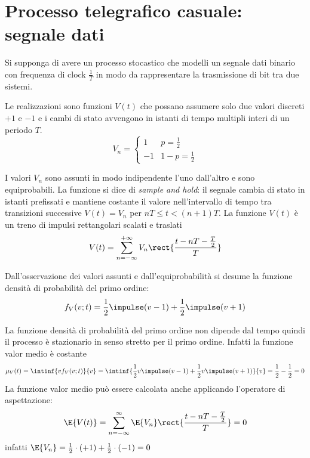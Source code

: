 \section{Processo telegrafico casuale: segnale dati}
Si supponga di avere un processo stocastico che modelli un segnale dati binario con frequenza di clock $\frac{1}{T}$ in modo da rappresentare la trasmissione di bit tra due sistemi.

Le realizzazioni sono funzioni $V(t)$ che possano assumere solo due valori discreti $+1$ e $-1$ e i cambi di stato avvengono in istanti di tempo multipli interi di un periodo $T$.
\begin{equation}
	V_n=\begin{cases}
		1&p=\frac{1}{2}\\
		-1&1-p=\frac{1}{2}
	\end{cases}
\end{equation}

I valori $V_n$ sono assunti in modo indipendente l'uno dall'altro e sono equiprobabili. La funzione si dice di \emph{sample and hold}: il segnale cambia di stato in istanti prefissati e mantiene costante il valore nell'intervallo di tempo tra transizioni successive $V(t)=V_n$ per $n T\leq t<(n+1)T$.
La funzione $V(t)$ è un treno di impulsi rettangolari scalati e traslati
\begin{equation}
\label{eq:segnale_dati}
	V(t)=\sum_{n=-\infty}^{+\infty}{V_n\rect{\frac{t-n T-\frac{T}{2}}{T}}}
\end{equation}

Dall'osservazione dei valori assunti e dall'equiprobabilità si desume la funzione densità di probabilità del primo ordine:
\begin{equation}
	f_V(v;t)=\frac{1}{2}\impulse(v-1)+\frac{1}{2}\impulse(v+1)
\end{equation}

La funzione densità di probabilità del primo ordine non dipende dal tempo quindi il processo è stazionario in senso stretto per il primo ordine. Infatti la funzione valor medio è costante
\begin{equation}
\label{eq:segnale_binario_media}
	\mu_V(t)=\intinf{v f_V(v;t)}{v}=\intinf{\frac{1}{2}v\impulse(v-1)+\frac{1}{2}v\impulse(v+1)}{v}=\frac{1}{2}-\frac{1}{2}=0
\end{equation}
La funzione valor medio può essere calcolata anche applicando l'operatore di aspettazione:
\begin{equation}
	\E{V(t)}=\sum_{n=-\infty}^{\infty}{\E{V_n}\rect{\frac{t-n T-\frac{T}{2}}{T}}}=0
\end{equation}
infatti $\E{V_n}=\frac{1}{2}\cdot(+1)+\frac{1}{2}\cdot(-1)=0$

